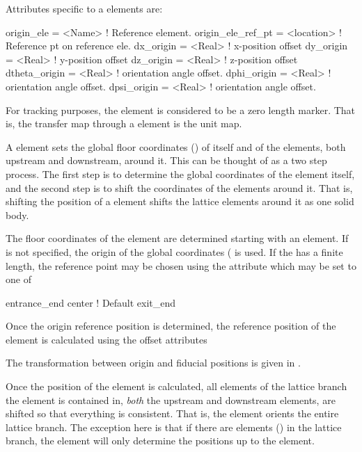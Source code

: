 Attributes specific to a  elements are:
\begin{example}
  origin_ele        = <Name>     ! Reference element.
  origin_ele_ref_pt = <location> ! Reference pt on reference ele.
  dx_origin         = <Real>     ! x-position offset
  dy_origin         = <Real>     ! y-position offset
  dz_origin         = <Real>     ! z-position offset
  dtheta_origin     = <Real>     ! orientation angle offset.
  dphi_origin       = <Real>     ! orientation angle offset.
  dpsi_origin       = <Real>     ! orientation angle offset.
\end{example}

For tracking purposes, the  element is considered to be a
zero length marker. That is, the transfer map through a 
element is the unit map.

A  element sets the global floor coordinates () of itself and of the
elements, both upstream and downstream, around it. This can be thought of as a two step process. The
first step is to determine the global coordinates of the  element itself, and the
second step is to shift the coordinates of the elements around it. That is, shifting the position
of a  element shifts the lattice elements around it as one solid body.

The floor coordinates of the  element are determined
starting with an  element. If  is not
specified, the origin of the global coordinates ( is
used. If the  has a finite length, the reference point
may be chosen using the  attribute which
may be set to one of
\begin{example}
  entrance_end
  center         ! Default
  exit_end
\end{example}

Once the origin reference position is determined, the reference
position of the  element is calculated using the offset
attributes 
\begin{example}
\end{example}
The transformation between origin and fiducial positions is given in
.

Once the position of the  element is calculated, all
elements of the lattice branch the  element is contained
in, {\em both} the upstream and downstream elements, are shifted so
that everything is consistent. That is, the  element
orients the entire lattice branch. The exception here is that if there
are   elements () in the lattice
branch, the  element will only determine the positions up
to the   element. 

